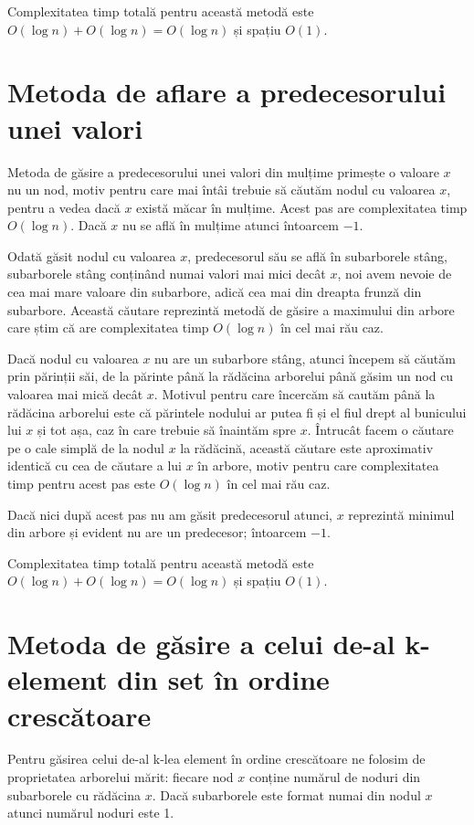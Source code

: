 \documentclass[]{report}
\begin{document}
	Complexitatea timp totală pentru această metodă este 
	$O(\log n) + O(\log n) = O(\log n)$ și spațiu $O(1)$.

	\section*{Metoda de aflare a predecesorului unei valori}

	Metoda de găsire a predecesorului unei valori din mulțime primește o valoare
	$x$ nu un nod, motiv pentru care mai întâi trebuie să căutăm nodul cu valoarea
	$x$, pentru a vedea dacă $x$ există măcar în mulțime. Acest pas are
	complexitatea timp $O(\log n)$. Dacă $x$ nu se află în mulțime atunci întoarcem
	$-1$.

	Odată găsit nodul cu valoarea $x$, predecesorul său se află în subarborele
	stâng, subarborele stâng conținând numai valori mai mici decât $x$, noi avem
	nevoie de cea mai mare valoare din subarbore, adică cea mai din dreapta frunză
	din subarbore. Această căutare reprezintă metodă de găsire a maximului din
	arbore care știm că are complexitatea timp $O(\log n)$ în cel mai rău caz.

	Dacă nodul cu valoarea $x$ nu are un subarbore stâng, atunci începem să
	căutăm prin părinții săi, de la părinte până la rădăcina arborelui până
	găsim un nod cu valoarea mai mică decât $x$. Motivul pentru care încercăm
	să cautăm până la rădăcina arborelui este că părintele nodului ar putea fi
	și el fiul drept al bunicului lui $x$ și tot așa, caz în care trebuie să
	înaintăm spre $x$. Întrucât facem o căutare pe o cale simplă de la nodul $x$
	la rădăcină, această căutare este aproximativ identică cu cea de căutare
	a lui $x$ în arbore, motiv pentru care complexitatea timp pentru acest pas
	este $O(\log n)$ în cel mai rău caz.

	Dacă nici după acest pas nu am găsit predecesorul atunci, $x$ reprezintă
	minimul din arbore și evident nu are un predecesor; întoarcem $-1$.

	Complexitatea timp totală pentru această metodă este 
	$O(\log n) + O(\log n) = O(\log n)$ și spațiu $O(1)$.

	\section*{Metoda de găsire a celui de-al k-element din set în ordine crescătoare}

	Pentru găsirea celui de-al k-lea element în ordine crescătoare ne folosim
	de proprietatea arborelui mărit: fiecare nod $x$ conține numărul de noduri
	din subarborele cu rădăcina $x$. Dacă subarborele este format numai din
	nodul $x$ atunci numărul noduri este 1.
\end{document}
